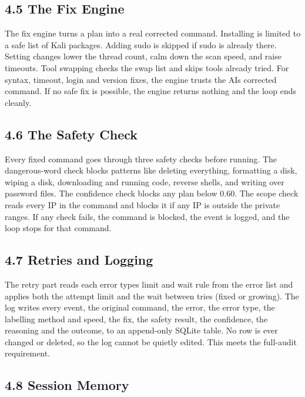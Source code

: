 \documentclass[
]{article}
\begin{document}
\hypertarget{the-fix-engine}{%
\subsection{4.5 The Fix Engine}\label{the-fix-engine}}

The fix engine turns a plan into a real corrected command. Installing is
limited to a safe list of Kali packages. Adding sudo is skipped if sudo
is already there. Setting changes lower the thread count, calm down the
scan speed, and raise timeouts. Tool swapping checks the swap list and
skips tools already tried. For syntax, timeout, login and version fixes,
the engine trusts the AI\textquotesingle s corrected command. If no safe
fix is possible, the engine returns nothing and the loop ends cleanly.

\hypertarget{the-safety-check}{%
\subsection{4.6 The Safety Check}\label{the-safety-check}}

Every fixed command goes through three safety checks before running. The
dangerous-word check blocks patterns like deleting everything,
formatting a disk, wiping a disk, downloading and running code, reverse
shells, and writing over password files. The confidence check blocks any
plan below 0.60. The scope check reads every IP in the command and
blocks it if any IP is outside the private ranges. If any check fails,
the command is blocked, the event is logged, and the loop stops for that
command.

\hypertarget{retries-and-logging}{%
\subsection{4.7 Retries and Logging}\label{retries-and-logging}}

The retry part reads each error type\textquotesingle s limit and wait
rule from the error list and applies both the attempt limit and the wait
between tries (fixed or growing). The log writes every event, the
original command, the error, the error type, the labelling method and
speed, the fix, the safety result, the confidence, the reasoning and the
outcome, to an append-only SQLite table. No row is ever changed or
deleted, so the log cannot be quietly edited. This meets the full-audit
requirement.

\hypertarget{session-memory}{%
\subsection{4.8 Session Memory}\label{session-memory}}
\end{document}
